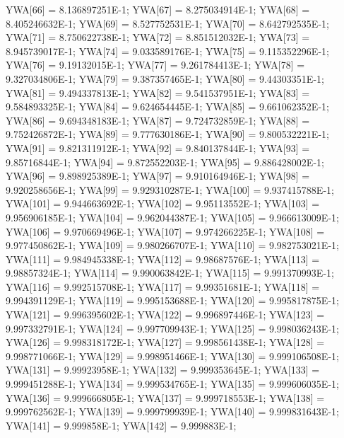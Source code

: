 \begin{code}
\begin{hide}
{      YWA[66] = 8.136897251E-1;
      YWA[67] = 8.275034914E-1;
      YWA[68] = 8.405246632E-1;
      YWA[69] = 8.527752531E-1;
      YWA[70] = 8.642792535E-1;
      YWA[71] = 8.750622738E-1;
      YWA[72] = 8.851512032E-1;
      YWA[73] = 8.945739017E-1;
      YWA[74] = 9.033589176E-1;
      YWA[75] = 9.115352296E-1;
      YWA[76] = 9.19132015E-1;
      YWA[77] = 9.261784413E-1;
      YWA[78] = 9.327034806E-1;
      YWA[79] = 9.387357465E-1;
      YWA[80] = 9.44303351E-1;
      YWA[81] = 9.494337813E-1;
      YWA[82] = 9.541537951E-1;
      YWA[83] = 9.584893325E-1;
      YWA[84] = 9.624654445E-1;
      YWA[85] = 9.661062352E-1;
      YWA[86] = 9.694348183E-1;
      YWA[87] = 9.724732859E-1;
      YWA[88] = 9.752426872E-1;
      YWA[89] = 9.777630186E-1;
      YWA[90] = 9.800532221E-1;
      YWA[91] = 9.821311912E-1;
      YWA[92] = 9.840137844E-1;
      YWA[93] = 9.85716844E-1;
      YWA[94] = 9.872552203E-1;
      YWA[95] = 9.886428002E-1;
      YWA[96] = 9.898925389E-1;
      YWA[97] = 9.910164946E-1;
      YWA[98] = 9.920258656E-1;
      YWA[99] = 9.929310287E-1;
      YWA[100] = 9.937415788E-1;
      YWA[101] = 9.944663692E-1;
      YWA[102] = 9.95113552E-1;
      YWA[103] = 9.956906185E-1;
      YWA[104] = 9.962044387E-1;
      YWA[105] = 9.966613009E-1;
      YWA[106] = 9.970669496E-1;
      YWA[107] = 9.974266225E-1;
      YWA[108] = 9.977450862E-1;
      YWA[109] = 9.980266707E-1;
      YWA[110] = 9.982753021E-1;
      YWA[111] = 9.984945338E-1;
      YWA[112] = 9.98687576E-1;
      YWA[113] = 9.98857324E-1;
      YWA[114] = 9.990063842E-1;
      YWA[115] = 9.991370993E-1;
      YWA[116] = 9.992515708E-1;
      YWA[117] = 9.99351681E-1;
      YWA[118] = 9.994391129E-1;
      YWA[119] = 9.995153688E-1;
      YWA[120] = 9.995817875E-1;
      YWA[121] = 9.996395602E-1;
      YWA[122] = 9.996897446E-1;
      YWA[123] = 9.997332791E-1;
      YWA[124] = 9.997709943E-1;
      YWA[125] = 9.998036243E-1;
      YWA[126] = 9.998318172E-1;
      YWA[127] = 9.998561438E-1;
      YWA[128] = 9.998771066E-1;
      YWA[129] = 9.998951466E-1;
      YWA[130] = 9.999106508E-1;
      YWA[131] = 9.99923958E-1;
      YWA[132] = 9.999353645E-1;
      YWA[133] = 9.999451288E-1;
      YWA[134] = 9.999534765E-1;
      YWA[135] = 9.999606035E-1;
      YWA[136] = 9.999666805E-1;
      YWA[137] = 9.999718553E-1;
      YWA[138] = 9.999762562E-1;
      YWA[139] = 9.999799939E-1;
      YWA[140] = 9.999831643E-1;
      YWA[141] = 9.999858E-1;
      YWA[142] = 9.999883E-1;

}
\end{hide}
\end{code}
